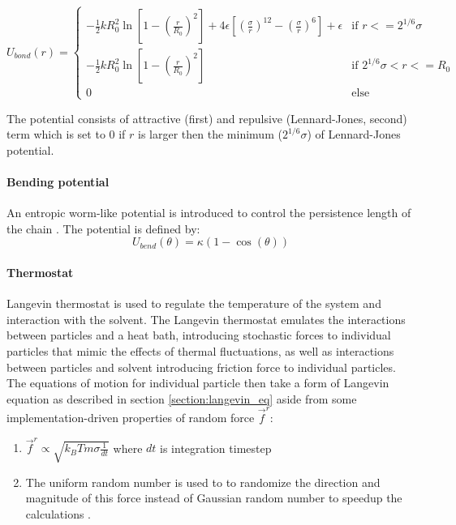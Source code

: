 \documentclass[
    paper=A4,pagesize=automedia,fontsize=12pt,
    BCOR=15mm,DIV=22,
    twoside,headinclude,footinclude=false,
    ngerman,fleqn,             %
    bibliography=totocnumbered,          %
    listof=totoc,                %
    listof=flat,                 %
    cleardoublepage=empty      %
    numbers=endperiod
]{scrartcl}
\begin{document}
\begin{equation}
    U_{bond}(r) = 
    \begin{cases}
        -\frac{1}{2} k R_0^2 \ln\left[1 - \left(\frac{r}{R_0}\right)^2\right] + 4 \epsilon \left[\left(\frac{\sigma}{r}\right)^{12} - \left(\frac{\sigma}{r}\right)^6\right] + \epsilon & \text{if } r <= 2^{1/6} \sigma \\
        -\frac{1}{2} k R_0^2 \ln\left[1 - \left(\frac{r}{R_0}\right)^2\right] & \text{if } 2^{1/6}\sigma < r <= R_0\\
        0 & \text{else}
    \end{cases}
\end{equation}

The potential consists of attractive (first) and repulsive (Lennard-Jones, second) term which is set to $0$ if $r$ is larger then
the minimum ($2^{1/6}\sigma$) of Lennard-Jones potential.

\paragraph{Bending potential}
\label{par:bend_potential}
An entropic worm-like potential is introduced to control the persistence length of the chain \cite{svaneborg_2020}.
The potential is defined by:
\begin{equation}
    U_{bend}(\theta) = \kappa (1 - \cos(\theta))
\end{equation}

\paragraph{Thermostat}
Langevin thermostat is used to regulate the temperature of the system and interaction with the solvent.
The Langevin thermostat emulates the interactions between particles and a heat bath, 
introducing stochastic forces to individual particles that mimic the effects of thermal fluctuations,
as well as interactions between particles and solvent introducing friction force to individual particles.
The equations of motion for individual particle then take a form of Langevin equation as described
in section \ref{section:langevin_eq} aside from some implementation-driven properties of random force $\vec{f}^r$:
\begin{enumerate}
    \item $\vec{f}^r \propto \sqrt{k_B T m \sigma \frac{1}{dt}}$ where $dt$ is integration timestep \cite{LAMMPS}
    \item The uniform random number is used to to randomize the direction 
    and magnitude of this force instead of Gaussian random number to speedup the
    calculations \cite{LAMMPS} \cite{dunweg}.
\end{enumerate}
\end{document}
